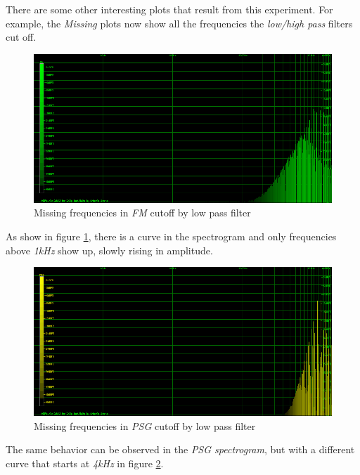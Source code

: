 \documentclass[10pt,a4paper]{report}
\begin{document}
There are some other interesting plots that result from this experiment. For example, the \textit{Missing} plots now show all the frequencies the \textit{low/high pass} filters cut off.

\begin{figure}[H]
	\centering
	\includegraphics[width=1.0\linewidth]{plots/Plot4-4-Missing-FM.png}
	\caption[Missing FM]{Missing frequencies in \textit{FM} cutoff by low pass filter}
	\label{fig:plot4-4-missing-fm}
\end{figure}

As show in figure \ref{fig:plot4-4-missing-fm}, there is a curve in the spectrogram and only frequencies above \textit{1kHz} show up, slowly rising in amplitude.

\begin{figure}[H]
	\centering
	\includegraphics[width=1.0\linewidth]{plots/Plot4-5-Missing-PSG.png}
	\caption[Missing PSG]{Missing frequencies in \textit{PSG} cutoff by low pass filter}
	\label{fig:plot4-5-missing-psg}
\end{figure}

The same behavior can be observed in the \textit{PSG spectrogram}, but with a different curve that starts at \textit{4kHz} in figure \ref{fig:plot4-5-missing-psg}.
\end{document}
